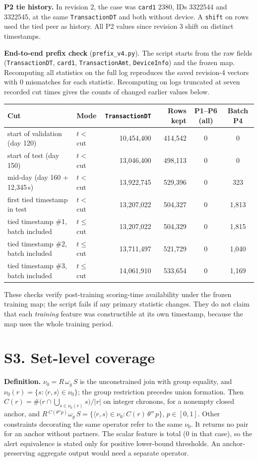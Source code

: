 \documentclass[10pt]{article}
\newcommand{\tf}[1]{\texttt{#1}}
\begin{document}
\textbf{P2 tie history.} In revision 2, the case was \tf{card1} 2380, IDs 3322544 and 3322545, at the same \tf{TransactionDT} and both without device. A \tf{shift} on rows used the tied peer as history. All P2 values since revision 3 shift on distinct timestamps.

\textbf{End-to-end prefix check} (\tf{prefix\_v4.py}). The script starts from the raw fields (\tf{TransactionDT}, \tf{card1}, \tf{TransactionAmt}, \tf{DeviceInfo}) and the frozen map. Recomputing all statistics on the full log reproduces the saved revision-4 vectors with 0 mismatches for each statistic. Recomputing on logs truncated at seven recorded cut times gives the counts of changed earlier values below.

\begin{center}\footnotesize
\begin{tabular}{@{}llrrcc@{}}
\toprule
Cut & Mode & \tf{TransactionDT} & Rows kept & P1--P6 (all) & Batch P4 \\
\midrule
start of validation (day 120) & $t<$ cut & 10,454,400 & 414,542 & 0 & 0 \\
start of test (day 150) & $t<$ cut & 13,046,400 & 498,113 & 0 & 0 \\
mid-day (day 160 + 12,345\,s) & $t<$ cut & 13,922,745 & 529,396 & 0 & 323 \\
first tied timestamp in test & $t<$ cut & 13,207,022 & 504,327 & 0 & 1,813 \\
tied timestamp \#1, batch included & $t\le$ cut & 13,207,022 & 504,329 & 0 & 1,815 \\
tied timestamp \#2, batch included & $t\le$ cut & 13,711,497 & 521,729 & 0 & 1,040 \\
tied timestamp \#3, batch included & $t\le$ cut & 14,061,910 & 533,654 & 0 & 1,169 \\
\bottomrule
\end{tabular}\end{center}
These checks verify post-training scoring-time availability under the frozen training map; the script fails if any primary statistic changes. They do not claim that each \emph{training} feature was constructible at its own timestamp, because the map uses the whole training period.

\section*{S3. Set-level coverage}
\textbf{Definition.} $\nu_0=R\,\omega_g\,S$ is the unconstrained join with group equality, and $\nu_0(r)=\{s:\langle r,s\rangle\in\nu_0\}$; the group restriction precedes union formation. Then $C(r)=\#\big(r\cap\bigcup_{s\in\nu_0(r)}s\big)/|r|$ on integer chronons, for a nonempty closed anchor, and $R\,{}^{C(\theta''p)}\omega_g\,S=\{\langle r,s\rangle\in\nu_0 : C(r)\,\theta''\,p\}$, $p\in[0,1]$. Other constraints decorating the same operator refer to the same $\nu_0$. It returns no pair for an anchor without partners. The scalar feature is total (0 in that case), so the alert equivalence is stated only for positive lower-bound thresholds. An anchor-preserving aggregate output would need a separate operator.
\end{document}
